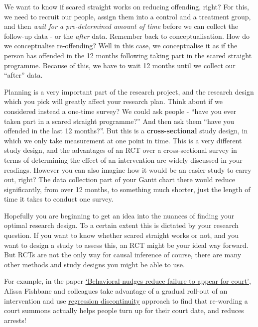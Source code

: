 \documentclass[
]{book}
\begin{document}
We want to know if scared straight works on reducing offending, right? For this, we need to recruit our people, assign them into a control and a treatment group, and then \emph{wait for a pre-determined amount of time} before we can collect the follow-up data - or the \emph{after} data. Remember back to conceptualisation. How do we conceptualise re-offending? Well in this case, we conceptualise it as if the person has offended in the 12 months following taking part in the scared straight programme. Because of this, we have to wait 12 months until we collect our ``after'' data.

Planning is a very important part of the research project, and the research design which you pick will greatly affect your research plan. Think about if we considered instead a one-time survey? We could ask people - ``have you ever taken part in a scared straight programme?'' And then ask them ``have you offended in the last 12 months?''. But this is a \textbf{cross-sectional} study design, in which we only take measurement at one point in time. This is a very different study design, and the advantages of an RCT over a cross-sectional survey in terms of determining the effect of an intervention are widely discussed in your readings. However you can also imagine how it would be an easier study to carry out, right? The data collection part of your Gantt chart there would reduce significantly, from over 12 months, to something much shorter, just the length of time it takes to conduct one survey.

Hopefully you are beginning to get an idea into the nuances of finding your optimal research design. To a certain extent this is dictated by your research question. If you want to know whether scared straight works or not, and you want to design a study to assess this, an RCT might be your ideal way forward. But RCTs are not the only way for causal inference of course, there are many other methods and study designs you might be able to use.

For example, in the paper \href{https://science.sciencemag.org/content/early/2020/10/07/science.abb6591/tab-pdf}{`Behavioral nudges reduce failure to appear for court'}, Alissa Fishbane and colleagues take advantage of a gradual roll-out of an intervention and use \href{https://methods.sagepub.com/reference/encyc-of-research-design/n375.xml}{regression discontinuity} approach to find that re-wording a court summons actually helps people turn up for their court date, and reduces arrests!
\end{document}
